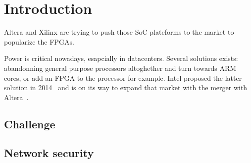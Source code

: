 \chapter{Introduction}

Altera and Xilinx are trying to push those SoC plateforms to the market to popularize the FPGAs.

Power is critical nowadays, esapcially in datacenters.
Several solutions exists: abandonning general purpose processors altoghether and turn towards ARM cores, or add an FPGA to the processor for example.
Intel proposed the latter solution in 2014~\cite{intel-xeon-fpga} and is on its way to expand that market with the merger with Altera~\cite{intel-altera-merger}.


\section{Challenge}

\section{Network security}